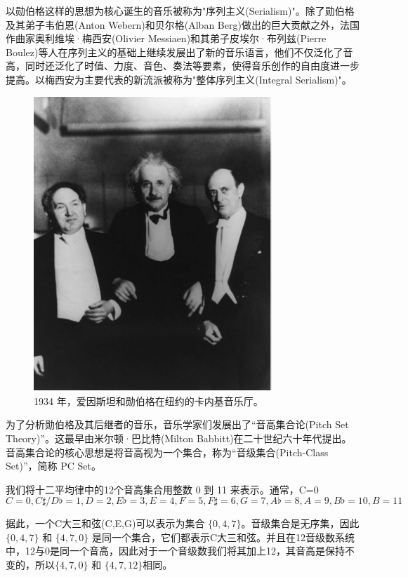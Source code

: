 \documentclass{article}
\begin{document}
以勋伯格这样的思想为核心诞生的音乐被称为"序列主义(Serialism)"。除了勋伯格及其弟子韦伯恩(Anton Webern)和贝尔格(Alban Berg)做出的巨大贡献之外，法国作曲家奥利维埃·梅西安(Olivier Messiaen)和其弟子皮埃尔·布列兹(Pierre Boulez)等人在序列主义的基础上继续发展出了新的音乐语言，他们不仅泛化了音高，同时还泛化了时值、力度、音色、奏法等要素，使得音乐创作的自由度进一步提高。以梅西安为主要代表的新流派被称为"整体序列主义(Integral Serialism)"。

\begin{figure}[h!]
    \centering
    \includegraphics[width=0.8\textwidth]{image/im1.png}
    \caption{1934 年，爱因斯坦和勋伯格在纽约的卡内基音乐厅。}
    \label{fig:einstein_schoenberg}
\end{figure}

为了分析勋伯格及其后继者的音乐，音乐学家们发展出了“音高集合论(Pitch Set Theory)”。这最早由米尔顿·巴比特(Milton Babbitt)在二十世纪六十年代提出\cite{babbitt1960}\cite{babbitt1961}。音高集合论的核心思想是将音高视为一个集合，称为“音级集合(Pitch-Class Set)”，简称 PC Set\cite{forte_structure_2007}。

我们将十二平均律中的12个音高集合用整数 0 到 11 来表示。通常，C=0
\[
    C=0, C\sharp/D\flat=1, D=2, E\flat=3, E=4, F=5, F\sharp=6, G=7, A\flat=8, A=9, B\flat=10, B=11
\]

据此，一个C大三和弦(C,E,G)可以表示为集合 $\{0, 4, 7\}$。音级集合是无序集，因此 $\{0, 4, 7\}$ 和 $\{4, 7, 0\}$ 是同一个集合，它们都表示C大三和弦。并且在12音级数系统中，12与0是同一个音高，因此对于一个音级数我们将其加上12，其音高是保持不变的，所以$\{4, 7, 0\}$ 和 $\{4, 7, 12\}$相同。
\end{document}
